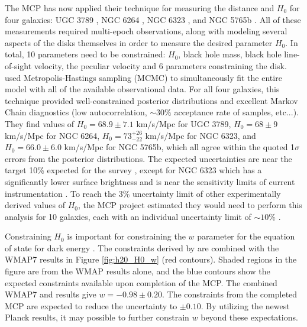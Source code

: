 The MCP has now applied their technique for measuring the distance and $H_0$ for four galaxies: UGC 3789 \citep{Braatz_2010,reid2013_mmproject_IV}, NGC 6264 \citep{Kuo_2013}, NGC 6323 \citep{kuo2015_mmproject_VI}, and NGC 5765b \citep{gao2015}. All of these measurements required multi-epoch observations, along with modeling several aspects of the disks themselves in order to measure the desired parameter $H_0$. In total, 10 parameters need to be constrained: $H_0$, black hole mass, black hole line-of-sight velocity, the peculiar velocity and 6 parameters constraining the disk. \citet{reid2013_mmproject_IV} used Metropolis-Hastings sampling (MCMC) to simultaneously fit the entire model with all of the available observational data. For all four galaxies, this technique provided well-constrained posterior distributions and excellent Markov Chain diagnostics (low autocorrelation, $\sim 30\%$ acceptance rate of samples, etc...). They find values of $H_0=68.9\pm7.1$ km/s/Mpc for UGC 3789, $H_0=68\pm9$ km/s/Mpc for NGC 6264, $H_0=73^{+26}_{-22}$ km/s/Mpc for NGC 6323, and $H_0=66.0\pm6.0$ km/s/Mpc for NGC 5765b, which all agree within the quoted 1$\sigma$ errors from the posterior distributions. The expected uncertainties are near the target 10\% expected for the survey \citep{reid2013_mmproject_IV}, except for NGC 6323 which has a significantly lower surface brightness and is near the sensitivity limits of current instrumentation \citep{kuo2015_mmproject_VI}. To reach the 3\% uncertainty limit of other experimentally derived values of $H_0$, the MCP project estimated they would need to perform this analysis for 10 galaxies, each with an individual uncertainty limit of $\sim 10\%$ \citep{reid2013_mmproject_IV}.  

Constraining $H_0$ is important for constraining the $w$ parameter for the equation of state for dark energy \citep{reid2013_mmproject_IV}. The constraints derived by \citet{reid2013_mmproject_IV} are combined with the WMAP7 results in Figure \ref{fig:h20_H0_w} (red contours). Shaded regions in the figure are from the WMAP results alone, and the blue contours show the expected constraints available upon completion of the MCP. The combined WMAP7 and \citet{reid2013_mmproject_IV} results give $w=-0.98\pm0.20$. The constraints from the completed MCP are expected to reduce the uncertainty to $\pm0.10$. By utilizing the newest Planck results, it may possible to further constrain $w$ beyond these expectations.

